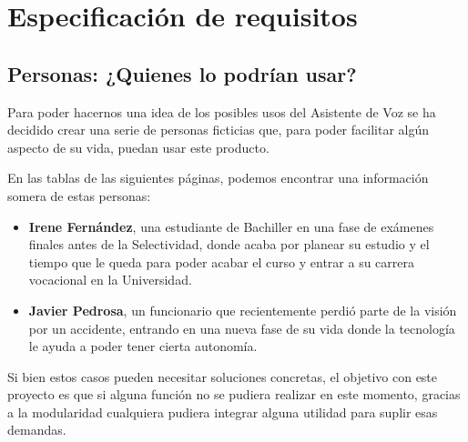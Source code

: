 \chapter{Especificación de requisitos}

\noindent{}

\section{Personas: ¿Quienes lo podrían usar?}

Para poder hacernos una idea de los posibles usos del Asistente de Voz se ha decidido crear una serie de personas ficticias que, para poder facilitar algún aspecto de su vida, puedan usar este producto.

En las tablas de las siguientes páginas, podemos encontrar una información somera de estas personas:

\begin{itemize}
	\item \textbf{Irene Fernández}, una estudiante de Bachiller en una fase de exámenes finales antes de la Selectividad, donde acaba por planear su estudio y el tiempo que le queda para poder acabar el curso y entrar a su carrera vocacional en la Universidad.
	
	\item \textbf{Javier Pedrosa}, un funcionario que recientemente perdió parte de la visión por un accidente, entrando en una nueva fase de su vida donde la tecnología le ayuda a poder tener cierta autonomía.
\end{itemize}

Si bien estos casos pueden necesitar soluciones concretas, el objetivo con este proyecto es que si alguna función no se pudiera realizar en este momento, gracias a la modularidad cualquiera pudiera integrar alguna utilidad para suplir esas demandas.

\newpage

